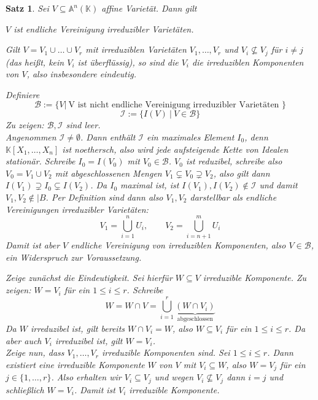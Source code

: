 \documentclass[11pt]{book}
\newtheorem{theorem}{Satz}[section]
\theoremstyle{nonumberbreak}
\newenvironment{pr}[1][]{\ifthenelse{\equal{#1}{}}{\proof}{\proof[#1]}\rm}{\endproof}
\begin{document}
\begin{spacing}{1.3}
\begin{theorem}%
Sei $V\subseteq \mathbb{A}^n(\mathbb{K})$ affine Varietät. Dann gilt
\begin{compactenum}
\item $V$ ist endliche Vereinigung irreduzibler Varietäten.
\item Gilt $V=V_1 \cup \ldots \cup V_r$ mit irreduziblen Varietäten $V_1, \ldots, V_r$ und $V_i \nsubseteq V_j$ für $i \neq j$ (das heißt, kein $V_i$ ist überflüssig), so sind die $V_i$ die irreduziblen Komponenten von $V$, also insbesondere eindeutig.
\end{compactenum}
\begin{pr}
\begin{compactenum}
\item Definiere
$$\mathcal{B}:=\{V \vert \ \textrm{V ist nicht endliche Vereinigung irreduzibler Varietäten } \} $$
$$\mathcal{I}:= \{I(V) \ \vert \ V\in \mathcal{B} \}$$
Zu zeigen: $\mathcal{B}, \mathcal{I}$ sind leer.\\
Angenommen $\mathcal{I}\neq \emptyset$. Dann enthält $\mathcal{I}$ ein maximales Element $I_0$, denn $\mathbb{K}[X_1, \ldots, X_n]$ ist noethersch, also wird jede aufsteigende Kette von Idealen stationär. Schreibe $I_0=I(V_0)$ mit $V_0 \in \mathcal{B}$. $V_0$ ist reduzibel, schreibe also $V_0=V_1 \cup V_2$ mit abgeschlossenen Mengen $V_1 \subsetneq V_0 \supsetneq V_2$, also gilt dann $I(V_1) \supsetneq I_0 \subsetneq I(V_2)$. Da $I_0$ maximal ist, ist $I(V_1), I(V_2) \notin \mathcal{I}$ und damit $V_1, V_2 \notin \mathcal|{B}$. Per Definition sind dann also $V_1, V_2$ darstellbar als endliche Vereinigungen irreduzibler Varietäten:
$$V_1=\bigcup_{i=1}^n U_{i}, \qquad V_2=\bigcup_{i=n+1}^m U_{i}$$
Damit ist aber $V$ endliche Vereinigung von irreduziblen Komponenten, also $V \in \mathcal{B}$, ein Widerspruch zur Voraussetzung.
\item Zeige zunächst die Eindeutigkeit. Sei hierfür $W\subseteq V$ irreduzible Komponente. Zu zeigen: $W=V_i$ für ein $1 \leqslant i \leqslant r$. Schreibe
$$W=W\cap V=\bigcup_{i=1}^r\underbrace{(W\cap V_i)}_{\textrm{abgeschlossen}}$$
Da $W$ irreduzibel ist, gilt bereits $W \cap V_i=W$, also $W\subseteq V_i$ für ein $1 \leqslant i \leqslant r$. Da aber auch $V_i$ irreduzibel ist, gilt $W=V_i$.\\
Zeige nun, dass $V_1, \ldots, V_r$ irreduzible Komponenten sind. Sei $1 \leqslant i \leqslant r$. Dann existiert eine irreduzible Komponente $W$ von $V$ mit $V_i \subseteq W$, also $W=V_j$ für ein $j \in \{1,\ldots, r\}$. Also erhalten wir $V_i \subseteq V_j$ und wegen $V_i \nsubseteq V_j$ dann $i=j$ und schließlich $W=V_i$. Damit ist $V_i$ irreduzible Komponente.
\end{compactenum}
\end{pr}
\end{theorem}


\end{spacing}
\end{document}

